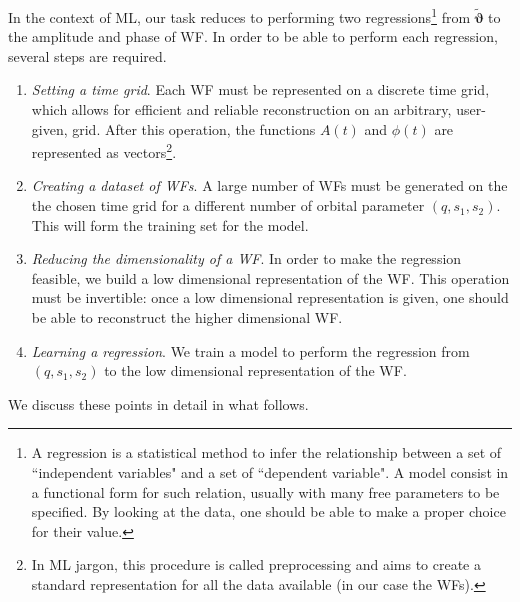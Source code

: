 In the context of ML, our task reduces to performing two regressions\footnote{A regression is a statistical method to infer the relationship between a set of ``independent variables" and a set of ``dependent variable". A model consist in a functional form for such relation, usually with many free parameters to be specified. By looking at the data, one should be able to make a proper choice for their value.} 
from $\tilde{\boldsymbol{\vartheta}}$ to the amplitude and phase of WF. 
In order to be able to perform each regression, several steps are required.

\begin{enumerate}[label=(\Alph*)]
	\item \textit{Setting a time grid}. Each WF must be represented on a discrete time grid, which allows for efficient and reliable reconstruction on an arbitrary, user-given, grid. After this operation, the functions $A(t)$ and $\phi(t)$ are represented as vectors\footnote{
In ML jargon, this procedure is called preprocessing and aims to create a standard representation for all the data available (in our case the WFs).
}.
	\item \textit{Creating a dataset of WFs}. A large number of WFs must be generated on the the chosen time grid for a different number of orbital parameter $(q,s_1,s_2)$. This will form the training set for the model.
	\item \textit{Reducing the dimensionality of a WF}. In order to make the regression feasible, we build a low dimensional representation of the WF. This operation must be invertible: once a low dimensional representation is given, one should be able to reconstruct the higher dimensional WF.
	\item \textit{Learning a regression}. We train a model to perform the regression from $(q, s_1, s_2)$ to the low dimensional representation of the WF.
\end{enumerate}
We discuss these points in detail in what follows.

%
